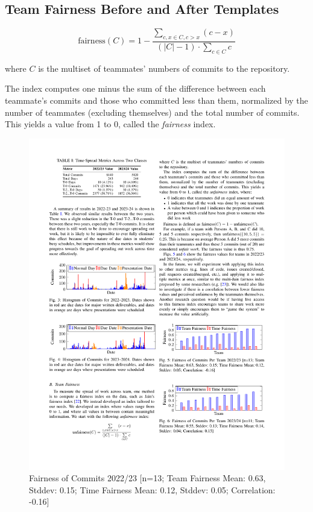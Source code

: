 \documentclass[poster, a1, plainboxedsections]{sciposter}
\begin{document}
\begin{multicols}{2}
\section*{Team Fairness Before and After Templates}

$$
\text{fairness}(C) = 1 - \frac{ \sum\limits_{c, x \in C, c > x} (c-x)}{(\left|C\right| -
1) \cdot \sum\limits_{c \in C} c}
$$

\noindent where $C$ is the multiset of teammates' numbers of commits to the 
repository.

The index computes one minus the sum of the difference between each teammate's
commits and those who committed less than them, normalized by the number of
teammates (excluding themselves) and the total number of commits. This yields a
value from 1 to 0, called the \textit{fairness} index.

\begin{figure}[h]
\centering
\includegraphics[width=1.0\linewidth]{../figures/FairnessCommits_22_23.pdf}
\caption{Fairness of Commits 2022/23 [n=13; Team Fairness Mean: 0.63, Stddev: 0.15; Time Fairness Mean: 0.12, Stddev: 0.05; Correlation: -0.16]}\label{Fig:Fairness2022/23}
\end{figure}


\end{multicols}
\end{document}
